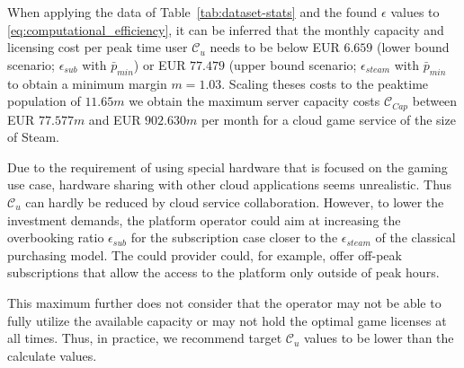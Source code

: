 %

When applying the data of Table~\ref{tab:dataset-stats} and the found $\epsilon$ values to \eqref{eq:computational_efficiency}, it can be inferred that the monthly capacity and licensing cost per peak time user $\mathcal{C}_u$ needs to be below EUR $6.659$ (lower bound scenario; $\epsilon_{sub}$ with $\bar{p}_{min}$) or EUR $77.479$ (upper bound scenario; $\epsilon_{steam}$ with $\bar{p}_{min}$ to obtain a minimum margin $m=1.03$. Scaling theses costs to the peaktime population of $11.65m$ we obtain the maximum server capacity costs $\mathcal{C}_{Cap}$ between EUR $77.577m$ and EUR $902.630m$ per month for a cloud game service of the size of Steam.

Due to the requirement of using special hardware that is focused on the gaming use case, hardware sharing with other cloud applications seems unrealistic. Thus $\mathcal{C}_u$ can hardly be reduced by cloud service collaboration. However, to lower the investment demands, the platform operator could aim at increasing the overbooking ratio $\epsilon_{sub}$ for the subscription case closer to the $\epsilon_{steam}$ of the classical purchasing model. The could provider could, for example, offer off-peak subscriptions that allow the access to the platform only outside of peak hours. 

This maximum further does not consider that the operator may not be able to fully utilize the available capacity or may not hold the optimal game licenses at all times. Thus, in practice, we recommend target $\mathcal{C}_{u}$ values to be lower than the calculate values.

